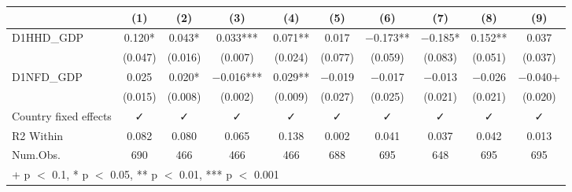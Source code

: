 \begin{table}
\centering
\begin{tabular}[t]{lccccccccc}
\toprule
  & (1) & (2) & (3) & (4) & (5) & (6) & (7) & (8) & (9)\\
\midrule
D1HHD\_GDP & \num{0.120}* & \num{0.043}* & \num{0.033}*** & \num{0.071}** & \num{0.017} & \num{-0.173}** & \num{-0.185}* & \num{0.152}** & \num{0.037}\\
 & (\num{0.047}) & (\num{0.016}) & (\num{0.007}) & (\num{0.024}) & (\num{0.077}) & (\num{0.059}) & (\num{0.083}) & (\num{0.051}) & (\num{0.037})\\
D1NFD\_GDP & \num{0.025} & \num{0.020}* & \num{-0.016}*** & \num{0.029}** & \num{-0.019} & \num{-0.017} & \num{-0.013} & \num{-0.026} & \num{-0.040}+\\
 & (\num{0.015}) & (\num{0.008}) & (\num{0.002}) & (\num{0.009}) & (\num{0.027}) & (\num{0.025}) & (\num{0.021}) & (\num{0.021}) & (\num{0.020})\\
\midrule
Country fixed effects & ✓ & ✓ & ✓ & ✓ & ✓ & ✓ & ✓ & ✓ & ✓\\
R2 Within & \num{0.082} & \num{0.080} & \num{0.065} & \num{0.138} & \num{0.002} & \num{0.041} & \num{0.037} & \num{0.042} & \num{0.013}\\
Num.Obs. & \num{690} & \num{466} & \num{466} & \num{466} & \num{688} & \num{695} & \num{648} & \num{695} & \num{695}\\
\bottomrule
\multicolumn{10}{l}{\rule{0pt}{1em}+ p $<$ 0.1, * p $<$ 0.05, ** p $<$ 0.01, *** p $<$ 0.001}\\
\end{tabular}
\end{table}
